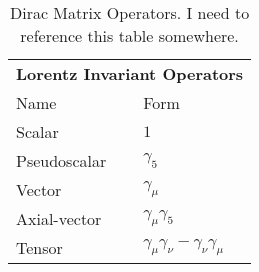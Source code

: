 %
%
%
\begin{table}[h!!!!t]
	\begin{center}
	\begin{tabular}{ l  l}
		\multicolumn{2}{l}{ \textbf{Lorentz Invariant Operators}}
		\\  %
		\multicolumn{1}{l}{Name} 		& \multicolumn{1}{l}{ Form}   %
		\\  \hline
		Scalar 			   				& $1$																			
		\\
		Pseudoscalar \;\;\;\;\;\;\;\;\;	& $\gamma_5$						 						
		\\
		Vector							& $\gamma_\mu$												
		\\
		Axial-vector					& $\gamma_\mu \gamma_5$											
		\\
		Tensor							& $\gamma_\mu \gamma_\nu - \gamma_\nu \gamma_\mu$										
		\\  \hline
	\end{tabular}
	\end{center}
	\caption[Dirac Matrix Operators]{Dirac Matrix Operators.  I need to reference this table somewhere.}
	\label{table:dirac_matrix_operators}
\end{table}
